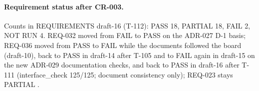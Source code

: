 \paragraph{Requirement status after CR-003.} Counts in REQUIREMENTS draft-16 (T-112):
PASS 18, PARTIAL 18, FAIL 2, NOT RUN 4. REQ-032 moved from FAIL to PASS on the
ADR-027 D-1 basis; REQ-036 moved from PASS to FAIL while the documents followed the
board (draft-10), back to PASS in draft-14 after T-105 and to FAIL again in
draft-15 on the new ADR-029 documentation checks, and back to PASS in draft-16
after T-111 (interface\_check 125/125; document consistency only); REQ-023 stays PARTIAL .
